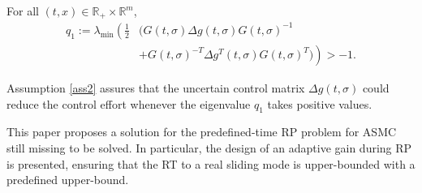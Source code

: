 \documentclass[twocolumn]{autart}    %
\begin{document}
\begin{assum}\label{ass2}
For all $(t,x)\in \mathbb{R}_{+}\times \mathbb{R}^m$, 
\begin{equation*}
\begin{aligned}
q_1:=\lambda_{\min}\left(\tfrac{1}{2}\right.&(G(t,\sigma)\Delta g(t,\sigma)G(t,\sigma)^{-1} \\
&\left.+G(t,\sigma)^{-T}\Delta g^T(t,\sigma)G(t,\sigma)^T)\right)>-1.
\end{aligned}
\end{equation*}
\end{assum}
\begin{rem}
Assumption \ref{ass2} assures that the uncertain control matrix $\Delta g(t,\sigma)$ could reduce the control effort whenever the eigenvalue $q_1$ takes positive values.
\end{rem}
This paper proposes a solution for the predefined-time RP problem for ASMC still missing to be solved.  In particular, the design of an adaptive gain during RP is presented, ensuring that the RT to a real sliding mode is upper-bounded with a predefined upper-bound.  \vspace{-5pt}
\end{document}
